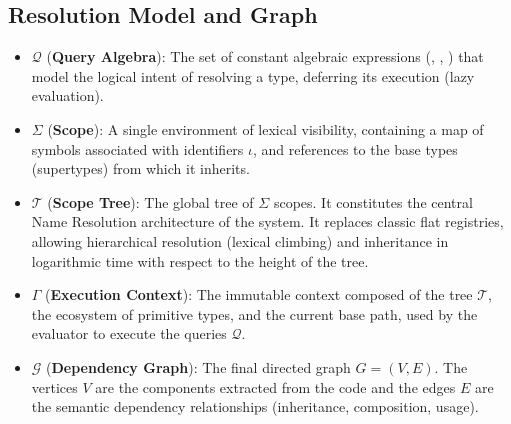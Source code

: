\subsection{Resolution Model and Graph}
\begin{itemize}
    \item $\mathcal{Q}$ (\textbf{Query Algebra}): The set of constant algebraic expressions (, , ) that model the logical intent of resolving a type, deferring its execution (lazy evaluation).
    \item $\Sigma$ (\textbf{Scope}): A single environment of lexical visibility, containing a map of symbols associated with identifiers $\iota$, and references to the base types (supertypes) from which it inherits.
    \item $\mathcal{T}$ (\textbf{Scope Tree}): The global tree of $\Sigma$ scopes. It constitutes the central Name Resolution architecture of the system. It replaces classic flat registries, allowing hierarchical resolution (lexical climbing) and inheritance in logarithmic time with respect to the height of the tree.
    \item $\Gamma$ (\textbf{Execution Context}): The immutable context composed of the tree $\mathcal{T}$, the ecosystem of primitive types, and the current base path, used by the evaluator to execute the queries $\mathcal{Q}$.
    \item $\mathcal{G}$ (\textbf{Dependency Graph}): The final directed graph $G = (V, E)$. The vertices $V$ are the components extracted from the code and the edges $E$ are the semantic dependency relationships (inheritance, composition, usage).
\end{itemize}


